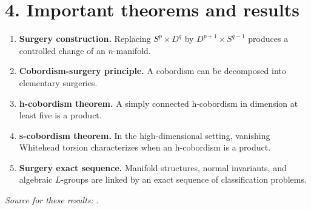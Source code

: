 \section*{4. Important theorems and results}
\begin{enumerate}[leftmargin=*,itemsep=0.35em]
\item \textbf{Surgery construction.} Replacing $S^p\times D^q$ by $D^{p+1}\times S^{q-1}$ produces a controlled change of an $n$-manifold.

\item \textbf{Cobordism-surgery principle.} A cobordism can be decomposed into elementary surgeries.

\item \textbf{h-cobordism theorem.} A simply connected h-cobordism in dimension at least five is a product.

\item \textbf{s-cobordism theorem.} In the high-dimensional setting, vanishing Whitehead torsion characterizes when an h-cobordism is a product.

\item \textbf{Surgery exact sequence.} Manifold structures, normal invariants, and algebraic $L$-groups are linked by an exact sequence of classification problems.
\end{enumerate}
\noindent\emph{Source for these results:} \cite{surgery_ref1}.

